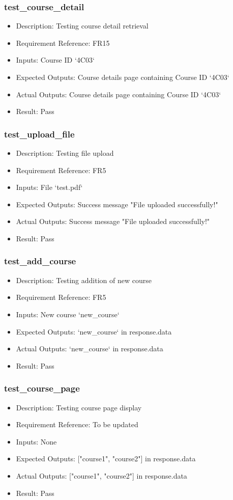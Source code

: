 \documentclass[12pt, titlepage]{article}
\begin{document}
\subsubsection{test\_course\_detail}\label{3.1.4}
\begin{itemize}
    \item Description: Testing course detail retrieval
    \item Requirement Reference: FR15
    \item Inputs: Course ID `4C03`
    \item Expected Outputs: Course details page containing Course ID `4C03`
    \item Actual Outputs: Course details page containing Course ID `4C03`
    \item Result: Pass
\end{itemize}
\subsubsection{test\_upload\_file}\label{3.1.5}
\begin{itemize}
    \item Description: Testing file upload
    \item Requirement Reference: FR5
    \item Inputs: File `test.pdf`
    \item Expected Outputs: Success message "File uploaded successfully!"
    \item Actual Outputs: Success message "File uploaded successfully!"
    \item Result: Pass
\end{itemize}
\subsubsection{test\_add\_course}\label{3.1.6}
\begin{itemize}
    \item Description: Testing addition of new course
    \item Requirement Reference: FR5
    \item Inputs: New course `new\_course`
    \item Expected Outputs: `new\_course` in response.data
    \item Actual Outputs: `new\_course` in response.data
    \item Result: Pass
\end{itemize}
\subsubsection{test\_course\_page}\label{3.1.7}
\begin{itemize}
    \item Description: Testing course page display
    \item Requirement Reference: To be updated
    \item Inputs: None
    \item Expected Outputs: ["course1", "course2"] in response.data
    \item Actual Outputs: ["course1", "course2"] in response.data
    \item Result: Pass
\end{itemize}
\end{document}
